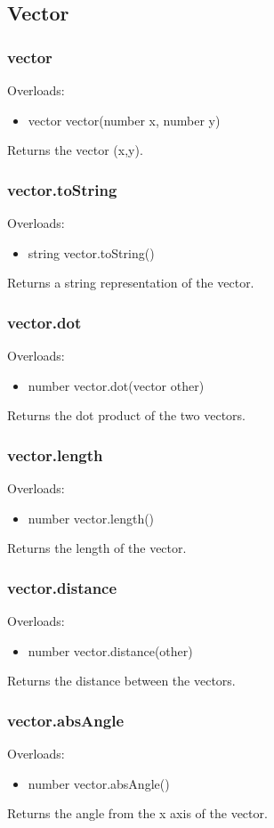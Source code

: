 \documentclass{book}
\newenvironment{ulist}
	{\begin{itemize}
			\itemsep0em}
	{\end{itemize}}
\begin{document}
\subsection{Vector}
\subsubsection{vector}
Overloads:
\begin{ulist}
	\item vector vector(number x, number y)
\end{ulist}
Returns the vector (x,y).

\subsubsection{vector.toString}
Overloads:
\begin{ulist}
	\item string vector.toString()
\end{ulist}
Returns a string representation of the vector.

\subsubsection{vector.dot}
Overloads:
\begin{ulist}
	\item number vector.dot(vector other)
\end{ulist}
Returns the dot product of the two vectors.

\subsubsection{vector.length}
Overloads:
\begin{ulist}
	\item number vector.length()
\end{ulist}
Returns the length of the vector.

\subsubsection{vector.distance}
Overloads:
\begin{ulist}
	\item number vector.distance(other)
\end{ulist}
Returns the distance between the vectors.

\subsubsection{vector.absAngle}
Overloads:
\begin{ulist}
	\item number vector.absAngle()
\end{ulist}
Returns the angle from the x axis of the vector.
\end{document}
